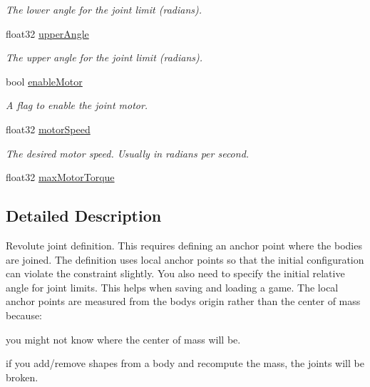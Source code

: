 \begin{DoxyCompactItemize}
\begin{DoxyCompactList}\small\item\em The lower angle for the joint limit (radians). \end{DoxyCompactList}\item 
float32 \hyperlink{structb2_revolute_joint_def_a692cfe333ad12afd5753a6ec54e39a66}{upper\+Angle}\hypertarget{structb2_revolute_joint_def_a692cfe333ad12afd5753a6ec54e39a66}{}\label{structb2_revolute_joint_def_a692cfe333ad12afd5753a6ec54e39a66}

\begin{DoxyCompactList}\small\item\em The upper angle for the joint limit (radians). \end{DoxyCompactList}\item 
bool \hyperlink{structb2_revolute_joint_def_aa94d9e66be9f03818d0cfbd9c70b2996}{enable\+Motor}\hypertarget{structb2_revolute_joint_def_aa94d9e66be9f03818d0cfbd9c70b2996}{}\label{structb2_revolute_joint_def_aa94d9e66be9f03818d0cfbd9c70b2996}

\begin{DoxyCompactList}\small\item\em A flag to enable the joint motor. \end{DoxyCompactList}\item 
float32 \hyperlink{structb2_revolute_joint_def_aced7cf768f4dcc3561576a39c7b92ec4}{motor\+Speed}\hypertarget{structb2_revolute_joint_def_aced7cf768f4dcc3561576a39c7b92ec4}{}\label{structb2_revolute_joint_def_aced7cf768f4dcc3561576a39c7b92ec4}

\begin{DoxyCompactList}\small\item\em The desired motor speed. Usually in radians per second. \end{DoxyCompactList}\item 
float32 \hyperlink{structb2_revolute_joint_def_a9fc1b67fe6d1bc31f88cc2cfd681fe30}{max\+Motor\+Torque}
\end{DoxyCompactItemize}


\subsection{Detailed Description}
Revolute joint definition. This requires defining an anchor point where the bodies are joined. The definition uses local anchor points so that the initial configuration can violate the constraint slightly. You also need to specify the initial relative angle for joint limits. This helps when saving and loading a game. The local anchor points are measured from the body\textquotesingle{}s origin rather than the center of mass because\+:
\begin{DoxyEnumerate}
\item you might not know where the center of mass will be.
\item if you add/remove shapes from a body and recompute the mass, the joints will be broken. 
\end{DoxyEnumerate}

